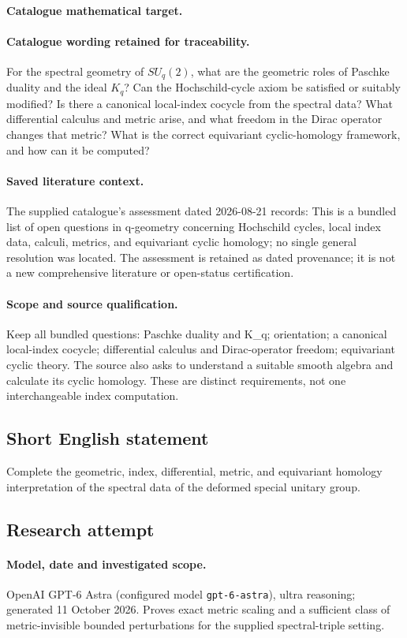 \documentclass[11pt]{article}
\begin{document}
\paragraph{Catalogue mathematical target.}
\paragraph{Catalogue wording retained for traceability.}
For the spectral geometry of $SU_q(2)$, what are the geometric roles of Paschke duality and the ideal $K_q$? Can the Hochschild-cycle axiom be satisfied or suitably modified? Is there a canonical local-index cocycle from the spectral data? What differential calculus and metric arise, and what freedom in the Dirac operator changes that metric? What is the correct equivariant cyclic-homology framework, and how can it be computed?

\paragraph{Saved literature context.} The supplied catalogue's assessment dated 2026-08-21 records: This is a bundled list of open questions in q-geometry concerning Hochschild cycles, local index data, calculi, metrics, and equivariant cyclic homology; no single general resolution was located. The assessment is retained as dated provenance; it is not a new comprehensive literature or open-status certification.
\paragraph{Scope and source qualification.}Keep all bundled questions: Paschke duality and K_q; orientation; a canonical local-index cocycle; differential calculus and Dirac-operator freedom; equivariant cyclic theory. The source also asks to understand a suitable smooth algebra and calculate its cyclic homology. These are distinct requirements, not one interchangeable index computation.
\subsection{Short English statement}
Complete the geometric, index, differential, metric, and equivariant homology interpretation of the spectral data of the deformed special unitary group.
\subsection{Research attempt}
\paragraph{Model, date and investigated scope.}
OpenAI GPT-6 Astra (configured model \texttt{gpt-6-astra}), ultra reasoning; generated 11 October 2026. Proves exact metric scaling and a sufficient class of metric-invisible bounded perturbations for the supplied spectral-triple setting.
\end{document}
